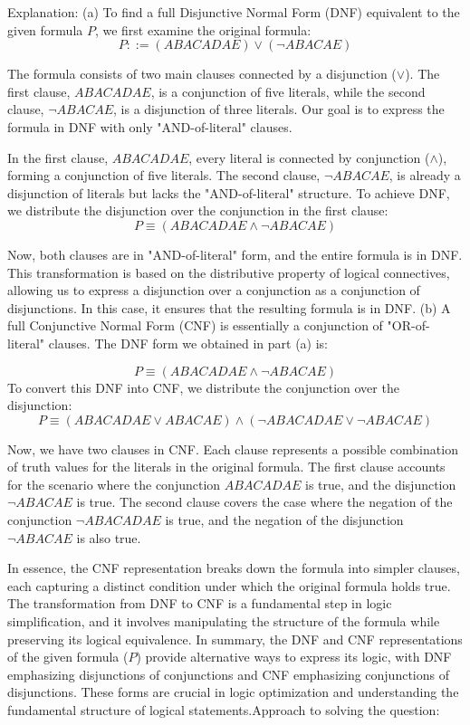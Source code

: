 \documentclass{article}
\begin{document}
Explanation:
(a) To find a full Disjunctive Normal Form (DNF) equivalent to the given formula \(P\), we first examine the original formula:
\[ P ::= (ABACADAE) \lor (\lnot ABACAE) \]
 
The formula consists of two main clauses connected by a disjunction (\(\lor\)). The first clause, \(ABACADAE\), is a conjunction of five literals, while the second clause, \(\lnot ABACAE\), is a disjunction of three literals. Our goal is to express the formula in DNF with only "AND-of-literal" clauses.
 
In the first clause, \(ABACADAE\), every literal is connected by conjunction (\(\land\)), forming a conjunction of five literals. The second clause, \(\lnot ABACAE\), is already a disjunction of literals but lacks the "AND-of-literal" structure.
To achieve DNF, we distribute the disjunction over the conjunction in the first clause:
\[ P \equiv (ABACADAE \land \lnot ABACAE) \]
 
Now, both clauses are in "AND-of-literal" form, and the entire formula is in DNF.
This transformation is based on the distributive property of logical connectives, allowing us to express a disjunction over a conjunction as a conjunction of disjunctions. In this case, it ensures that the resulting formula is in DNF.
(b) A full Conjunctive Normal Form (CNF) is essentially a conjunction of "OR-of-literal" clauses. The DNF form we obtained in part (a) is:
 
\[ P \equiv (ABACADAE \land \lnot ABACAE) \]
To convert this DNF into CNF, we distribute the conjunction over the disjunction:
\[ P \equiv (ABACADAE \lor ABACAE) \land (\lnot ABACADAE \lor \lnot ABACAE) \]
 
Now, we have two clauses in CNF. Each clause represents a possible combination of truth values for the literals in the original formula. The first clause accounts for the scenario where the conjunction \(ABACADAE\) is true, and the disjunction \(\lnot ABACAE\) is true. The second clause covers the case where the negation of the conjunction \(\lnot ABACADAE\) is true, and the negation of the disjunction \(\lnot ABACAE\) is also true.
 
In essence, the CNF representation breaks down the formula into simpler clauses, each capturing a distinct condition under which the original formula holds true. The transformation from DNF to CNF is a fundamental step in logic simplification, and it involves manipulating the structure of the formula while preserving its logical equivalence.
In summary, the DNF and CNF representations of the given formula (\(P\)) provide alternative ways to express its logic, with DNF emphasizing disjunctions of conjunctions and CNF emphasizing conjunctions of disjunctions. These forms are crucial in logic optimization and understanding the fundamental structure of logical statements.Approach to solving the question:
 
\end{document}
